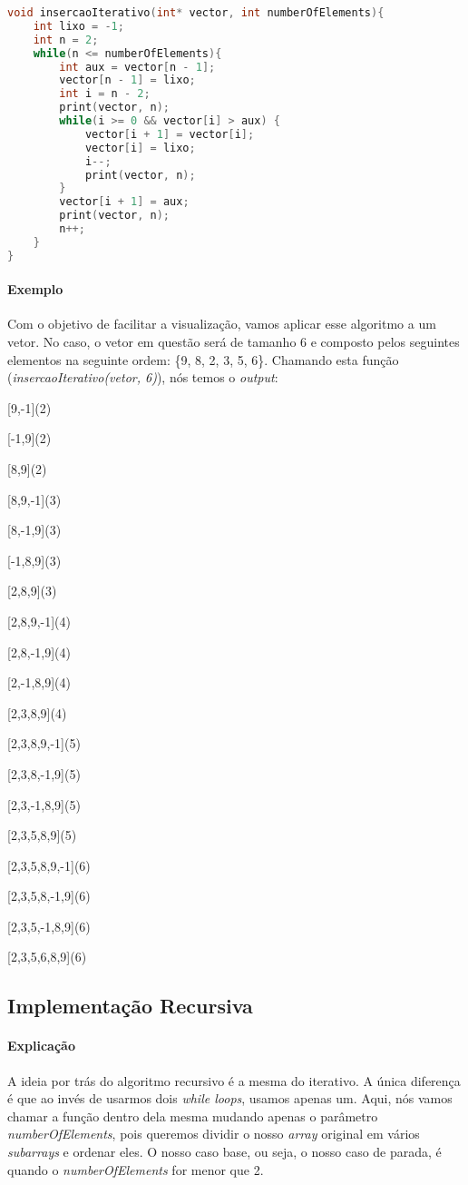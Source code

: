 \begin{lstlisting}[language=C]
void insercaoIterativo(int* vector, int numberOfElements){
    int lixo = -1;
    int n = 2;
    while(n <= numberOfElements){
        int aux = vector[n - 1];
        vector[n - 1] = lixo;
        int i = n - 2;
        print(vector, n);
        while(i >= 0 && vector[i] > aux) {
            vector[i + 1] = vector[i];
            vector[i] = lixo;
            i--;
            print(vector, n);
        }
        vector[i + 1] = aux;
        print(vector, n);
        n++;
    }
}

\end{lstlisting}

\paragraph{Exemplo}
Com o objetivo de facilitar a visualização, vamos aplicar esse algoritmo a um vetor. No caso, o vetor em questão será de tamanho 6 e composto pelos seguintes elementos na seguinte ordem:
\{9, 8, 2, 3, 5, 6\}. Chamando esta função (\textit{insercaoIterativo(vetor, 6)}), nós temos o \textit{output}:

[9,-1](2)

[-1,9](2)

[8,9](2)

[8,9,-1](3)

[8,-1,9](3)

[-1,8,9](3)

[2,8,9](3)

[2,8,9,-1](4)

[2,8,-1,9](4)

[2,-1,8,9](4)

[2,3,8,9](4)

[2,3,8,9,-1](5)

[2,3,8,-1,9](5)

[2,3,-1,8,9](5)

[2,3,5,8,9](5)

[2,3,5,8,9,-1](6)

[2,3,5,8,-1,9](6)

[2,3,5,-1,8,9](6)

[2,3,5,6,8,9](6)

\subsection{Implementação Recursiva}
\paragraph{Explicação}
A ideia por trás do algoritmo recursivo é a mesma do iterativo. A única diferença é que ao invés de usarmos dois \textit{while loops}, usamos apenas um. Aqui, nós vamos chamar a função
dentro dela mesma mudando apenas o parâmetro \textit{numberOfElements}, pois queremos dividir o nosso \textit{array} original em vários \textit{subarrays} e ordenar eles. O nosso caso
base, ou seja, o nosso caso de parada, é quando o \textit{numberOfElements} for menor que 2.

